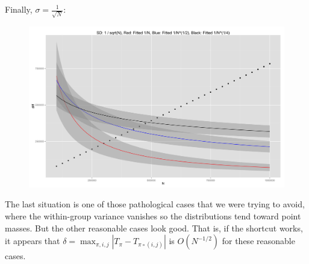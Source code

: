 Finally, $\sigma = \frac{1}{\sqrt{N}}$:
\begin{figure}[!ht]
  \centering
  \includegraphics[scale=.06]{./simulations/better_bound_condition/rate_plot_3.png}
\end{figure}

The last situation is one of those pathological cases that we were
trying to avoid, where the within-group variance vanishes so the
distributions tend toward point masses.  But the other reasonable
cases look good.  That is, if the shortcut works, it appears that
$\delta = \max_{\pi, i, j} |T_{\pi} - T_{\pi \circ (i, j)}|$ is
$O(N^{-1/2})$ for these reasonable cases.
